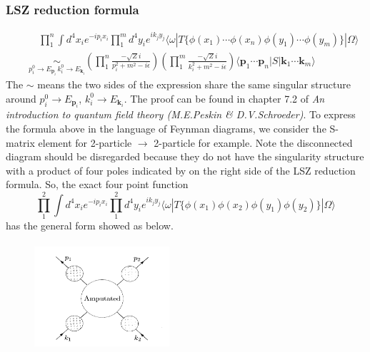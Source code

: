 \documentclass{article}
\begin{document}
\subsubsection{LSZ reduction formula}
\begin{eqnarray}
&& \quad \prod_1^n \int d^4 x_i e^{-ip_ix_i} \prod_1^m d^4 y_i e^{ik_jy_j} \langle \omega | T \{\phi(x_1) \cdots \phi(x_n) \phi(y_1) \cdots \phi(y_m)\} | \Omega \rangle \nonumber \\
&& \underset{ p_i^0 \to E_{\mathbf{p}_i}\, k_i^0 \to E_{\mathbf{k}_i}}{\sim}  \left( \prod_1^n \frac{-\sqrt{Z} i}{p_i^2 + m^2 -i\epsilon} \right) \left( \prod_1^m \frac{-\sqrt{Z} i}{k_i^2 + m^2 -i\epsilon} \right) \langle \mathbf{p}_1 \cdots \mathbf{p}_n | S | \mathbf{k}_1 \cdots \mathbf{k}_m \rangle \nonumber
\end{eqnarray}
The $\sim$ means the two sides of the expression share the same singular structure around $p_i^0 \to E_{\mathbf{p}_i}$, $k_i^0 \to E_{\mathbf{k}_i}$.
The proof can be found in chapter 7.2 of \emph{An introduction to quantum field theory (M.E.Peskin \& D.V.Schroeder)}.
To express the formula above in the language of Feynman diagrams, we consider the S-matrix element for 2-particle $\to$ 2-particle for example. Note the disconnected diagram should be disregarded because they do not have the singularity structure with a product of four poles indicated by on the right side of the LSZ reduction formula. So, the exact four point function
\[\prod_1^2 \int d^4 x_i e^{-ip_ix_i} \prod_1^2 d^4 y_i e^{ik_jy_j} \langle \omega | T \{\phi(x_1)\phi(x_2)\phi(y_1) \phi(y_2)\} | \Omega \rangle \]
has the general form showed as below.
\begin{figure}[!h]
\centering
\includegraphics[height=4cm ,width=5cm]{./pic/LSZ1.png}
\caption*{}
\end{figure}\\
\end{document}

